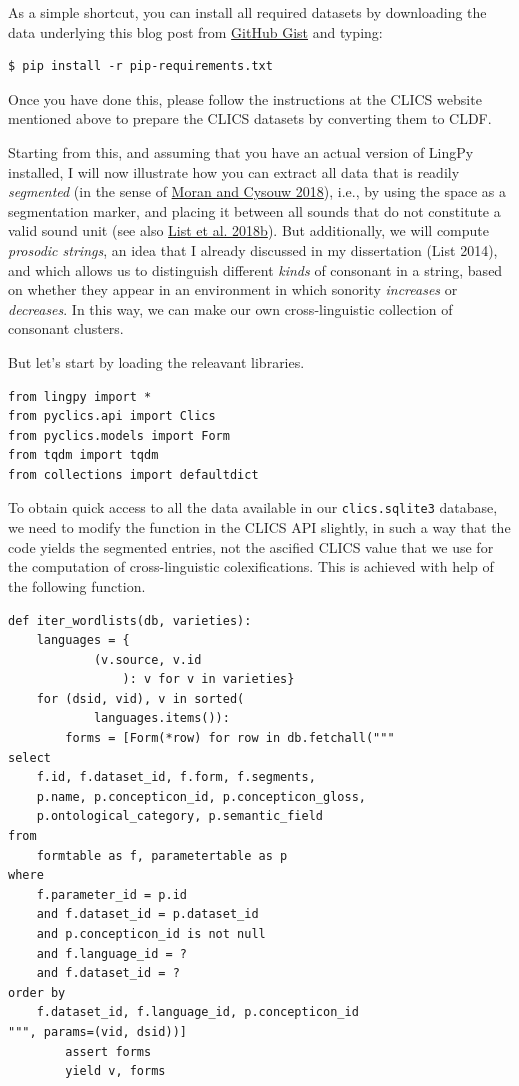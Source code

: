 \documentclass[
  a4paper,
  14pt,
  oneside,
  tablecaptionabove
]{scrbook}
\begin{document}
As a simple shortcut, you can install all
required datasets by downloading the data underlying this blog post from
\href{https://gist.github.com/LinguList/1056960125ca79428b420257fa4b02eb}{GitHub
Gist} and typing:

\begin{lstlisting}
$ pip install -r pip-requirements.txt
\end{lstlisting}

Once you have done this, please follow the instructions at the CLICS
website mentioned above to prepare the CLICS datasets by converting them
to CLDF.

Starting from this, and assuming that you have an actual version of
LingPy installed, I will now illustrate how you can extract all data
that is readily \emph{segmented} (in the sense of
\href{http://bibliography.lingpy.org?key=Moran2018}{Moran and Cysouw
2018}), i.e., by using the space as a segmentation marker, and placing
it between all sounds that do not constitute a valid sound unit (see
also \href{http://bibliography.lingpy.org?key=List2018d}{List et al.
2018b}). But additionally, we will compute \emph{prosodic strings}, an
idea that I already discussed in my dissertation (List 2014), and which
allows us to distinguish different \emph{kinds} of consonant in a
string, based on whether they appear in an environment in which sonority
\emph{increases} or \emph{decreases}.  In this way, we can make our own
cross-linguistic collection of consonant clusters.

But let's start by loading the releavant libraries.

\begin{lstlisting}
from lingpy import *
from pyclics.api import Clics
from pyclics.models import Form
from tqdm import tqdm
from collections import defaultdict
\end{lstlisting}

To obtain quick access to all the data available in our
\lstinline!clics.sqlite3! database, we need to modify the function in
the CLICS API slightly, in such a way that the code yields the segmented
entries, not the ascified CLICS value that we use for the computation of
cross-linguistic colexifications. This is achieved with help of the
following function.

\begin{lstlisting}
def iter_wordlists(db, varieties):
    languages = {
            (v.source, v.id
                ): v for v in varieties}
    for (dsid, vid), v in sorted(
            languages.items()):
        forms = [Form(*row) for row in db.fetchall("""
select
    f.id, f.dataset_id, f.form, f.segments,
    p.name, p.concepticon_id, p.concepticon_gloss,
    p.ontological_category, p.semantic_field 
from
    formtable as f, parametertable as p
where
    f.parameter_id = p.id
    and f.dataset_id = p.dataset_id
    and p.concepticon_id is not null
    and f.language_id = ?
    and f.dataset_id = ?
order by
    f.dataset_id, f.language_id, p.concepticon_id
""", params=(vid, dsid))]
        assert forms
        yield v, forms
\end{lstlisting}
\end{document}
